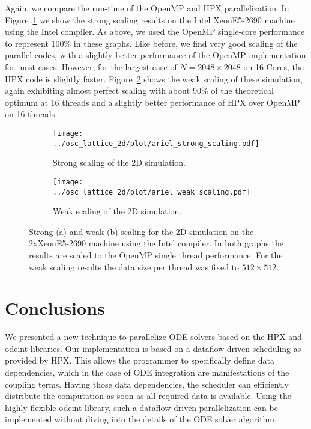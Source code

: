 \documentclass[10pt]{scrartcl}
\begin{document}
Again, we compare the run-time of the OpenMP and HPX parallelization.
In Figure~\ref{fig:strong_scaling2D} we show the strong scaling results on the Intel XeonE5-2690 machine using the Intel compiler.
As above, we used the OpenMP single-core performance to represent 100\% in these graphs.
Like before, we find very good scaling of the parallel codes, with a slightly better performance of the OpenMP implementation for most cases.
However, for the largest case of $N=2048\times2048$ on 16 Cores, the HPX code is slightly faster.
Figure~\ref{fig:weak_scaling2D} shows the weak scaling of these simulation, again exhibiting almost perfect scaling with about 90\% of the theoretical optimum at 16 threads and a slightly better performance of HPX over OpenMP on 16 threads.

\begin{figure}
 \begin{subfigure}[b]{0.49\textwidth}
  \centering
  \texttt{[image: ../osc\_lattice\_2d/plot/ariel\_strong\_scaling.pdf]}\hfill
  \caption{Strong scaling of the 2D simulation.} 
  \label{fig:strong_scaling2D}
 \end{subfigure}
 \begin{subfigure}[b]{0.49\textwidth}
  \centering
  \texttt{[image: ../osc\_lattice\_2d/plot/ariel\_weak\_scaling.pdf]}\hfill
  \caption{Weak scaling of the 2D simulation.} 
  \label{fig:weak_scaling2D}
 \end{subfigure}
 \caption{Strong (a) and weak (b) scaling for the 2D simulation on the 2xXeonE5-2690 machine using the Intel compiler. In both graphs the results are scaled to the OpenMP single thread performance. For the weak scaling results the data size per thread was fixed to $512\times512$.}
 \label{fig:marvin_scaling2D}
\end{figure}

\section{Conclusions}

We presented a new technique to parallelize ODE solvers based on the HPX and odeint libraries.
Our implementation is based on a dataflow driven scheduling as provided by HPX.
This allows the programmer to specifically define data dependencies, which in the case of ODE integration are manifestations of the coupling terms.
Having those data dependencies, the scheduler can efficiently distribute the computation as soon as all required data is available.
Using the highly flexible odeint library, such a dataflow driven parallelization can be implemented without diving into the details of the ODE solver algorithm.
\end{document}
